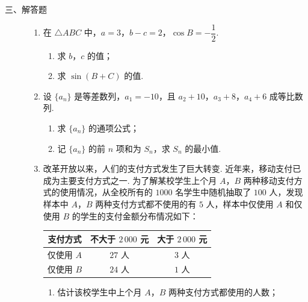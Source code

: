 \begin{description}

    \item[三、解答题]

    \begin{enumerate}[leftmargin=5pt]

      \addtocounter{enumi}{+14}

        \item 在 \(\triangle ABC\) 中，\(a=3\)，\(b-c=2\)，\(\cos B=-\dfrac12\).

\begin{enumerate}
\item 求 \(b\)，\(c\) 的值；

\item 求 \(\sin(B+C)\) 的值.
\end{enumerate}

        \item 设 \(\{a_n\}\) 是等差数列，\(a_1=-10\)，且 \(a_2+10\)，\(a_3+8\)，\(a_4+6\) 成等比数列.

\begin{enumerate}
\item 求 \(\{a_n\}\) 的通项公式；

\item 记 \(\{a_n\}\) 的前 \(n\) 项和为 \(S_n\)，求 \(S_n\) 的最小值.
\end{enumerate}

        \item 改革开放以来，人们的支付方式发生了巨大转变. 近年来，移动支付已成为主要支付方式之一. 为了解某校学生上个月 \(A\)，\(B\) 两种移动支付方式的使用情况，从全校所有的 \(1000\) 名学生中随机抽取了 \(100\) 人，发现样本中 \(A\)，\(B\) 两种支付方式都不使用的有 \(5\) 人，样本中仅使用 \(A\) 和仅使用 \(B\) 的学生的支付金额分布情况如下：

\begin{center}
\begin{tabular}{|c|c|c|}
\hline
支付方式 & 不大于 \(2\,000\) 元 & 大于 \(2\,000\) 元 \\
\hline
仅使用 \(A\) & \(27\) 人 & \(3\) 人 \\
\hline
仅使用 \(B\) & \(24\) 人 & \(1\) 人 \\
\hline
\end{tabular}
\end{center}

\begin{enumerate}
\item 估计该校学生中上个月 \(A\)，\(B\) 两种支付方式都使用的人数；


\end{enumerate}
\end{enumerate}
\end{description}
